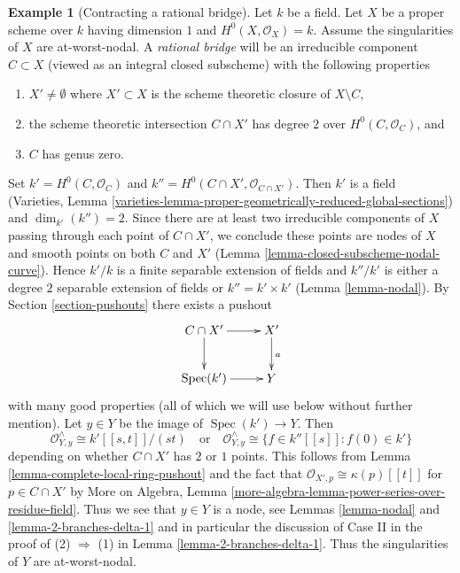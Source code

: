 \documentclass{stacks-project}
\theoremstyle{plain}
\theoremstyle{definition}
\newtheorem{example}[subsection]{Example}
\theoremstyle{remark}
\numberwithin{equation}{subsection}
\def\Spec{\mathop{\mathrm{Spec}}}
\begin{document}
\begin{example}[Contracting a rational bridge]
\label{example-rational-bridge}
Let $k$ be a field. Let $X$ be a proper scheme over $k$ having dimension $1$
and $H^0(X, \mathcal{O}_X) = k$. Assume the singularities of $X$ are
at-worst-nodal.
A {\it rational bridge} will be an irreducible component $C \subset X$
(viewed as an integral closed subscheme) with the following properties
\begin{enumerate}
\item $X' \not = \emptyset$ where $X' \subset X$ is the scheme theoretic closure
of $X \setminus C$,
\item the scheme theoretic intersection $C \cap X'$
has degree $2$ over $H^0(C, \mathcal{O}_C)$, and
\item $C$ has genus zero.
\end{enumerate}
Set $k' = H^0(C, \mathcal{O}_C)$ and
$k'' = H^0(C \cap X', \mathcal{O}_{C \cap X'})$.
Then $k'$ is a field (Varieties, Lemma
\ref{varieties-lemma-proper-geometrically-reduced-global-sections})
and $\dim_{k'}(k'') = 2$. Since there are at least
two irreducible components of $X$ passing through
each point of $C \cap X'$, we conclude these points are nodes of $X$
and smooth points on both $C$ and $X'$
(Lemma \ref{lemma-closed-subscheme-nodal-curve}).
Hence $k'/k$ is a finite separable extension of fields
and $k''/k'$ is either a degree $2$ separable extension of fields
or $k'' = k' \times k'$ (Lemma \ref{lemma-nodal}). By
Section \ref{section-pushouts} there exists a pushout
$$
\xymatrix{
C \cap X' \ar[r] \ar[d] &
X' \ar[d]^a \\
\Spec(k') \ar[r] &
Y
}
$$
with many good properties (all of which we will use below without
further mention). Let $y \in Y$ be the image of $\Spec(k') \to Y$.
Then
$$
\mathcal{O}_{Y, y}^\wedge \cong k'[[s, t]]/(st)
\quad\text{or}\quad
\mathcal{O}_{Y, y}^\wedge \cong
\{f \in k''[[s]] : f(0) \in k'\}
$$
depending on whether $C \cap X'$ has $2$ or $1$ points.
This follows from Lemma \ref{lemma-complete-local-ring-pushout}
and the fact that $\mathcal{O}_{X', p} \cong \kappa(p)[[t]]$
for $p \in C \cap X'$ by More on Algebra, Lemma
\ref{more-algebra-lemma-power-series-over-residue-field}.
Thus we see that $y \in Y$ is a node, see Lemmas \ref{lemma-nodal}
and \ref{lemma-2-branches-delta-1} and in particular the discussion
of Case II in the proof of (2) $\Rightarrow$ (1) in
Lemma \ref{lemma-2-branches-delta-1}.
Thus the singularities of $Y$ are at-worst-nodal.


\end{example}
\end{document}
